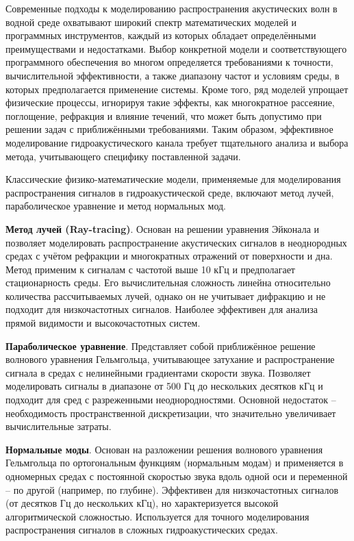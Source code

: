 \documentclass[
    numbers=section,
    document-code={ВКРБ--09.03.04--10.19--XX--26--81}
]{../latex/fqw}
\begin{document}
    Современные подходы к моделированию распространения акустических волн в водной среде
    охватывают широкий спектр математических моделей и программных инструментов,
    каждый из которых обладает определёнными преимуществами и недостатками.
    Выбор конкретной модели и соответствующего программного обеспечения во многом определяется требованиями к точности,
    вычислительной эффективности, а также диапазону частот и условиям среды, в которых предполагается применение системы.
    Кроме того, ряд моделей упрощает физические процессы, игнорируя такие эффекты, как
    многократное рассеяние, поглощение, рефракция и влияние течений,
    что может быть допустимо при решении задач с приближёнными требованиями.
    Таким образом, эффективное моделирование гидроакустического канала требует тщательного анализа и выбора метода,
    учитывающего специфику поставленной задачи.

    Классические физико-математические модели, применяемые для моделирования распространения сигналов
    в гидроакустической среде, включают
    метод лучей,
    параболическое уравнение и
    метод нормальных мод.

    \textbf{Метод лучей (Ray-tracing)\nbspace\cite[гл.~3]{jensenComputationalOceanAcoustics2011}}.
    Основан на решении уравнения Эйконала и позволяет моделировать распространение акустических сигналов
    в неоднородных средах с учётом рефракции и многократных отражений от поверхности и дна.
    Метод применим к сигналам с частотой выше 10 кГц и предполагает стационарность среды.
    Его вычислительная сложность линейна относительно количества рассчитываемых лучей,
    однако он не учитывает дифракцию и не подходит для низкочастотных сигналов.
    Наиболее эффективен для анализа прямой видимости и высокочастотных систем.

    \textbf{Параболическое уравнение\nbspace\cite[гл.~6]{jensenComputationalOceanAcoustics2011}}.
    Представляет собой приближённое решение волнового уравнения Гельмгольца, учитывающее затухание и
    распространение сигнала в средах с нелинейными градиентами скорости звука.
    Позволяет моделировать сигналы в диапазоне от 500 Гц до нескольких десятков кГц и
    подходит для сред с разреженными неоднородностями.
    Основной недостаток -- необходимость пространственной дискретизации,
    что значительно увеличивает вычислительные затраты.

    \textbf{Нормальные моды\nbspace\cite[гл.~5]{jensenComputationalOceanAcoustics2011}}.
    Основан на разложении решения волнового уравнения Гельмгольца по ортогональным функциям (нормальным модам) и
    применяется в одномерных средах с постоянной скоростью звука вдоль одной оси и переменной --
    по другой (например, по глубине).
    Эффективен для низкочастотных сигналов (от десятков Гц до нескольких кГц),
    но характеризуется высокой алгоритмической сложностью.
    Используется для точного моделирования распространения сигналов в сложных гидроакустических средах.
\end{document}
